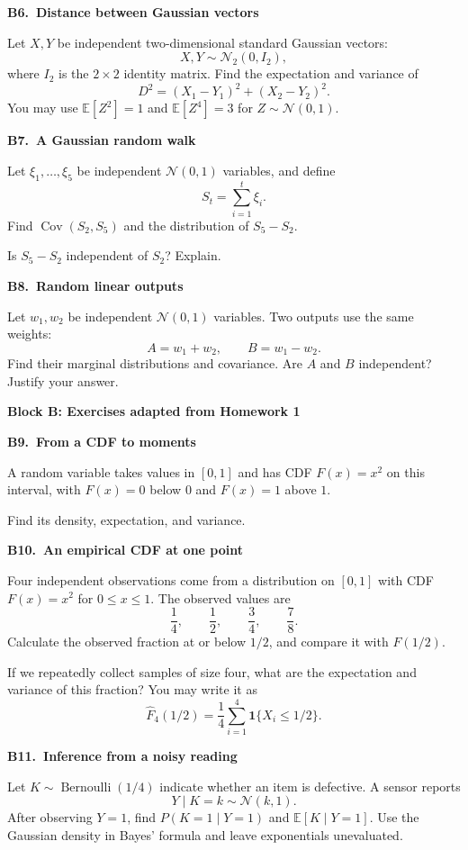 \documentclass[11pt,a4paper]{article}
\newcommand{\blocktitle}[2]{{\Large\sffamily\bfseries\color{Ink}Block #1: #2}\par\vspace{5pt}}
\newenvironment{question}[2]{\par\addvspace{10pt}\begin{minipage}{\linewidth}{\sffamily\bfseries\color{Ink}#1.\ #2}\par\vspace{3pt}}{\end{minipage}\par}
\newcommand{\E}{\mathbb E}
\newcommand{\Cov}{\operatorname{Cov}}
\begin{document}
\begin{question}{B6}{Distance between Gaussian vectors}
Let $X,Y$ be independent two-dimensional standard Gaussian vectors:
\[
X,Y\sim\mathcal N_2(0,I_2),
\]
where $I_2$ is the $2\times2$ identity matrix. Find the expectation and
variance of
\[
D^2=(X_1-Y_1)^2+(X_2-Y_2)^2.
\]
You may use $\E[Z^2]=1$ and $\E[Z^4]=3$ for $Z\sim\mathcal N(0,1)$.
\end{question}

\begin{question}{B7}{A Gaussian random walk}
Let $\xi_1,\ldots,\xi_5$ be independent $\mathcal N(0,1)$ variables, and define
\[
S_t=\sum_{i=1}^{t}\xi_i.
\]
Find $\Cov(S_2,S_5)$ and the distribution of $S_5-S_2$.

Is $S_5-S_2$ independent of $S_2$? Explain.
\end{question}

\begin{question}{B8}{Random linear outputs}
Let $w_1,w_2$ be independent $\mathcal N(0,1)$ variables. Two outputs use
the same weights:
\[
A=w_1+w_2,\qquad B=w_1-w_2.
\]
Find their marginal distributions and covariance. Are $A$ and $B$
independent? Justify your answer.
\end{question}

\newpage
\blocktitle{B}{Exercises adapted from Homework 1}
\begin{question}{B9}{From a CDF to moments}
A random variable takes values in $[0,1]$ and has CDF $F(x)=x^2$ on this
interval, with $F(x)=0$ below $0$ and $F(x)=1$ above $1$.

Find its density, expectation, and variance.
\end{question}

\begin{question}{B10}{An empirical CDF at one point}
Four independent observations come from a distribution on $[0,1]$ with
CDF $F(x)=x^2$ for $0\le x\le1$. The observed values are
\[
\frac14,\qquad \frac12,\qquad \frac34,\qquad \frac78.
\]
Calculate the observed fraction at or below $1/2$, and compare it with
$F(1/2)$.

If we repeatedly collect samples of size four, what are the expectation
and variance of this fraction? You may write it as
\[
\widehat F_4(1/2)=\frac14\sum_{i=1}^{4}\mathbf1\{X_i\le1/2\}.
\]
\end{question}

\begin{question}{B11}{Inference from a noisy reading}
Let $K\sim\operatorname{Bernoulli}(1/4)$ indicate whether an item is defective.
A sensor reports
\[
Y\mid K=k\sim\mathcal N(k,1).
\]
After observing $Y=1$, find $P(K=1\mid Y=1)$ and $\E[K\mid Y=1]$.
Use the Gaussian density in Bayes' formula and leave exponentials unevaluated.
\end{question}
\end{document}
